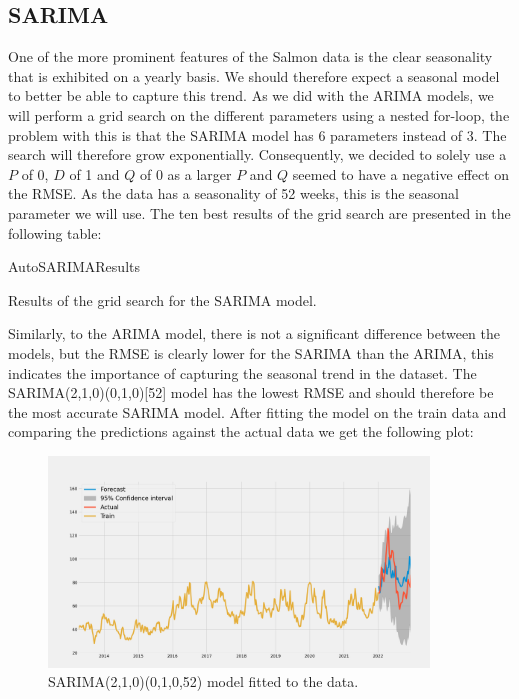 \subsection{SARIMA}\label{sec:sarima}
One of the more prominent features of the Salmon data is the clear seasonality that is exhibited on a yearly basis. We should therefore expect a seasonal model to better be able to capture this trend. As we did with the ARIMA models, we will perform a grid search on the different parameters using a nested for-loop, the problem with this is that the SARIMA model has 6 parameters instead of 3. The search will therefore grow exponentially. Consequently, we decided to solely use a $P$ of 0, $D$ of 1 and $Q$ of 0 as a larger $P$ and $Q$ seemed to have a negative effect on the RMSE. As the data has a seasonality of 52 weeks, this is the seasonal parameter we will use. The ten best results of the grid search are presented in the following table:
\begin{table}[H]
    \begin{center}
        {AutoSARIMAResults}
        \caption{Results of the grid search for the SARIMA model.}\label{tab:SARIMAResults}
    \end{center}
\end{table}
Similarly, to the ARIMA model, there is not a significant difference between the models, but the RMSE is clearly lower for the SARIMA than the ARIMA, this indicates the importance of capturing the seasonal trend in the dataset. The SARIMA(2,1,0)(0,1,0)[52] model has the lowest RMSE and should therefore be the most accurate SARIMA model. After fitting the model on the train data and comparing the predictions against the actual data we get the following plot:
\begin{figure}[H]
    \begin{center}
        \includegraphics[width=0.9\textwidth]{data/Figures/ARIMA/SARIMA_2_1_0_0_1_0_52.png}
        \caption{SARIMA(2,1,0)(0,1,0,52) model fitted to the data.}\label{fig:SARIMA_21001052}
    \end{center}
\end{figure}

